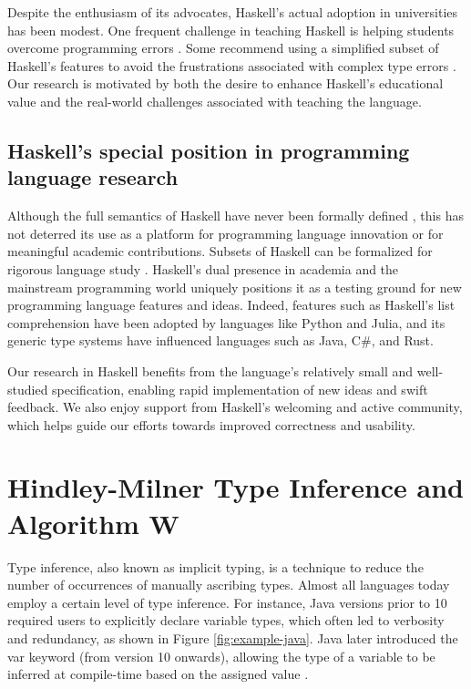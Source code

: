 Despite the enthusiasm of its advocates, Haskell's actual adoption in universities has been modest. One frequent challenge in teaching Haskell is helping students overcome programming errors \cite{Jun2000-yu, Tirronen2015-nr}. Some recommend using a simplified subset of Haskell's features to avoid the frustrations associated with complex type errors \cite{Heeren2003-kd}. Our research is motivated by both the desire to enhance Haskell's educational value and the real-world challenges associated with teaching the language.

\subsection{Haskell's special position in programming language research}

Although the full semantics of Haskell have never been formally defined \cite{Hudak2007-kn}, this has not deterred its use as a platform for programming language innovation or for meaningful academic contributions. Subsets of Haskell can be formalized for rigorous language study \cite{FaxEn2002-nd}. Haskell's dual presence in academia and the mainstream programming world uniquely positions it as a testing ground for new programming language features and ideas. Indeed, features such as Haskell's list comprehension have been adopted by languages like Python and Julia, and its generic type systems have influenced languages such as Java, C\#, and Rust.

Our research in Haskell benefits from the language's relatively small and well-studied specification, enabling rapid implementation of new ideas and swift feedback. We also enjoy support from Haskell's welcoming and active community, which helps guide our efforts towards improved correctness and usability.

\section{Hindley-Milner Type Inference and Algorithm W}

Type inference, also known as implicit typing, is a technique to reduce the number of occurrences of manually ascribing types. Almost all languages today employ a certain level of type inference. For instance, Java versions prior to 10 required users to explicitly declare variable types, which often led to verbosity and redundancy, as shown in Figure \ref{fig:example-java}. Java later introduced the var keyword (from version 10 onwards), allowing the type of a variable to be inferred at compile-time based on the assigned value \cite{Java_Developers2023-an}.  

